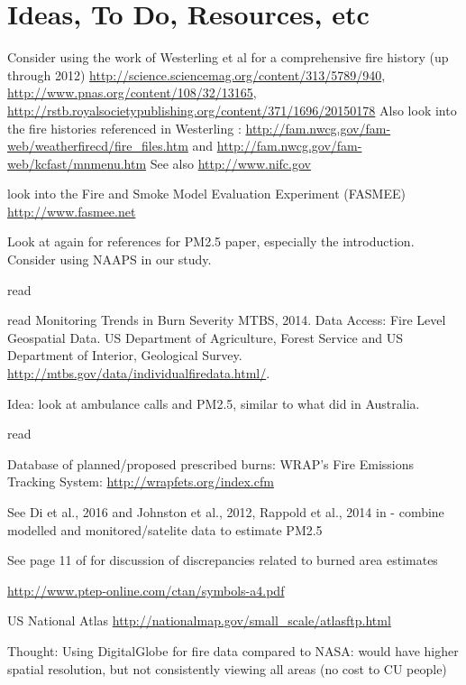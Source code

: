 \section{Ideas, To Do, Resources, etc}

Consider using the work of Westerling et al for a comprehensive fire history (up through 2012) \url{http://science.sciencemag.org/content/313/5789/940}, \url{http://www.pnas.org/content/108/32/13165}, \url{http://rstb.royalsocietypublishing.org/content/371/1696/20150178} \cite{westerling_increasing_2016,WesterlingCorrection2016} Also look into the fire histories referenced in Westerling \cite{westerling_increasing_2016,WesterlingCorrection2016}: \url{http://fam.nwcg.gov/fam-web/weatherfirecd/fire_files.htm} and \url{http://fam.nwcg.gov/fam-web/kcfast/mnmenu.htm} See also \url{http://www.nifc.gov}

look into the Fire and Smoke Model Evaluation Experiment (FASMEE) \url{http://www.fasmee.net}

Look at \cite{kollanus_effects_2016} again for references for PM2.5 paper, especially the introduction. Consider using NAAPS in our study. 

read \cite{mcclure_US_2018}

read Monitoring Trends in Burn Severity MTBS, 2014. Data Access: Fire Level Geospatial
Data. US Department of Agriculture, Forest Service and US Department of
Interior, Geological Survey. \url{http://mtbs.gov/data/individualfiredata.html/}.

Idea: look at ambulance calls and PM2.5, similar to what \cite{salimi_ambient_2016} did in Australia.

read \cite{williamson_transdisciplinary_2016}

Database of planned/proposed prescribed burns: WRAP's Fire Emissions Tracking System: \url{http://wrapfets.org/index.cfm}

See Di et al., 2016 and Johnston et al., 2012, Rappold et al., 2014 in \cite{jones_application_2017} - combine modelled and monitored/satelite data to estimate PM2.5

See page 11 of \cite{hyde_air_2017} for discussion of discrepancies related to burned area estimates

\url{http://www.ptep-online.com/ctan/symbols-a4.pdf}

US National Atlas \url{http://nationalmap.gov/small_scale/atlasftp.html}

Thought: Using DigitalGlobe for fire data compared to NASA: would have higher spatial resolution, but not consistently viewing all areas (no cost to CU people) 


